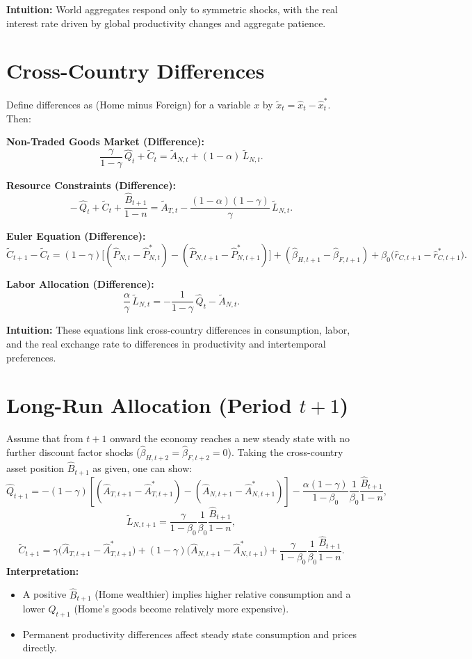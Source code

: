 \documentclass[a4paper,12pt]{article} %
\theoremstyle{nonitalic}
\begin{document}
\textbf{Intuition:} World aggregates respond only to symmetric shocks, with the real interest rate driven by global productivity changes and aggregate patience.

\section{Cross-Country Differences}

Define differences as (Home minus Foreign) for a variable \( x \) by \( \tilde{x}_t = \hat{x}_t - \hat{x}^*_t \). Then:

\textbf{Non-Traded Goods Market (Difference):}
\[
\frac{\gamma}{1-\gamma}\,\hat{Q}_t + \tilde{C}_t = \tilde{A}_{N,t} + (1-\alpha)\,\tilde{L}_{N,t}. \tag{9a}
\]

\textbf{Resource Constraints (Difference):}
\[
-\,\hat{Q}_t + \tilde{C}_t + \frac{\hat{B}_{t+1}}{1-n} = \tilde{A}_{T,t} - \frac{(1-\alpha)(1-\gamma)}{\gamma}\,\tilde{L}_{N,t}. \tag{9b}
\]

\textbf{Euler Equation (Difference):}
\[
\tilde{C}_{t+1}-\tilde{C}_t = (1-\gamma)\Big[(\hat{P}_{N,t}-\hat{P}^*_{N,t}) - (\hat{P}_{N,t+1}-\hat{P}^*_{N,t+1})\Big] + (\hat{\beta}_{H,t+1}-\hat{\beta}_{F,t+1}) + \beta_0\Big(\hat{r}_{C,t+1}-\hat{r}^*_{C,t+1}\Big). \tag{9c}
\]

\textbf{Labor Allocation (Difference):}
\[
\frac{\alpha}{\gamma}\,\tilde{L}_{N,t} = -\frac{1}{1-\gamma}\,\hat{Q}_t - \tilde{A}_{N,t}. \tag{9d}
\]

\textbf{Intuition:} These equations link cross-country differences in consumption, labor, and the real exchange rate to differences in productivity and intertemporal preferences.

\section{Long-Run Allocation (Period \(t+1\))}

Assume that from \( t+1 \) onward the economy reaches a new steady state with no further discount factor shocks (\( \hat{\beta}_{H,t+2} = \hat{\beta}_{F,t+2} = 0 \)). Taking the cross-country asset position \( \hat{B}_{t+1} \) as given, one can show:
\[
\hat{Q}_{t+1} = - (1-\gamma)\left[(\hat{A}_{T,t+1}-\hat{A}^*_{T,t+1}) - (\hat{A}_{N,t+1}-\hat{A}^*_{N,t+1})\right] - \frac{\alpha(1-\gamma)}{1-\beta_0}\frac{1}{\beta_0}\frac{\hat{B}_{t+1}}{1-n},
\]
\[
\tilde{L}_{N,t+1} = \frac{\gamma}{1-\beta_0}\frac{1}{\beta_0}\frac{\hat{B}_{t+1}}{1-n},
\]
\[
\tilde{C}_{t+1} = \gamma\big(\hat{A}_{T,t+1}-\hat{A}^*_{T,t+1}\big) + (1-\gamma)\big(\hat{A}_{N,t+1}-\hat{A}^*_{N,t+1}\big) + \frac{\gamma}{1-\beta_0}\frac{1}{\beta_0}\frac{\hat{B}_{t+1}}{1-n}.
\]
\textbf{Interpretation:}
\begin{itemize}
    \item A positive \( \hat{B}_{t+1} \) (Home wealthier) implies higher relative consumption and a lower \( Q_{t+1} \) (Home’s goods become relatively more expensive).
    \item Permanent productivity differences affect steady state consumption and prices directly.
\end{itemize}
\end{document}
